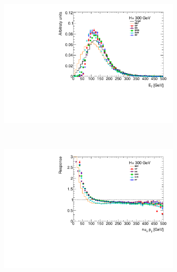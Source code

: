 \documentclass[twocolumn]{scrartcl}
\begin{document}
\begin{figure}[htpb]
    \centering
    \begin{subfigure}{.48\textwidth}
        \includegraphics[width=\textwidth]{plots/pt_300.pdf}
    \end{subfigure}
    ~
    \begin{subfigure}{.48\textwidth}
        \includegraphics[width=\textwidth]{plots/profile_300.pdf}
    \end{subfigure}


\end{figure}
\end{document}
